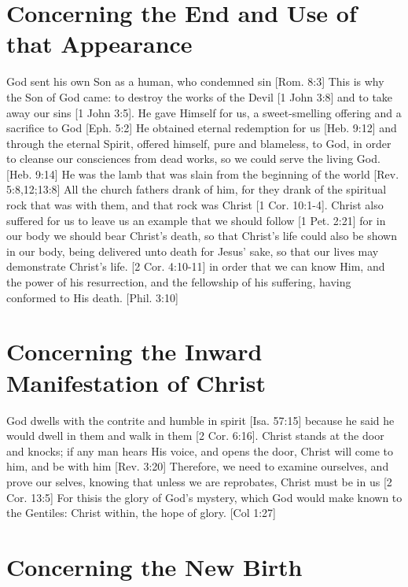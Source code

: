 \documentclass[../main.tex]{subfiles}
\begin{document}
	\section{Concerning the End and Use of that Appearance}

	God sent his own Son as a human, who condemned sin [Rom. 8:3] This is why the Son of God came: to destroy the works of the Devil [1 John 3:8] and to take away our sins [1 John 3:5]. He gave Himself for us, a sweet-smelling offering and a sacrifice to God [Eph. 5:2] He obtained eternal redemption for us [Heb. 9:12] and through the eternal Spirit, offered himself, pure and blameless, to God, in order to cleanse our consciences from dead works, so we could serve the living God. [Heb. 9:14] He was the lamb that was slain from the beginning of the world [Rev. 5:8,12;13:8] All the church fathers drank of him, for they drank of the spiritual rock that was with them, and that rock was Christ [1 Cor. 10:1-4]. Christ also suffered for us to leave us an example that we should follow [1 Pet. 2:21] for in our body we should bear Christ's death, so that Christ's life could also be shown in our body, being delivered unto death for Jesus' sake,  so that our lives may demonstrate Christ's life. [2 Cor. 4:10-11] in order that we can know Him, and the power of his resurrection, and the fellowship of his suffering, having conformed to His death. [Phil. 3:10]

	\section{Concerning the Inward Manifestation of Christ}

	God dwells with the contrite and humble in spirit [Isa. 57:15] because he said he would dwell in them and walk in them [2 Cor. 6:16]. Christ stands at the door and knocks; if any man hears His voice, and opens the door, Christ will come to him, and be with him [Rev. 3:20] Therefore, we need to examine ourselves, and prove our selves, knowing that unless we are reprobates, Christ must be in us [2 Cor. 13:5] For thisis the glory of God's mystery, which God would make known to the Gentiles: Christ within, the hope of glory. [Col 1:27]

	\section{Concerning the New Birth}
\end{document}
